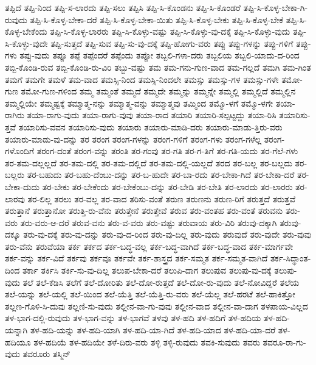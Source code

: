{ತಪ್ಪಿದೆ
ತಪ್ಪಿ-ನಿಂದ
ತಪ್ಪಿ-ಸ-ಲಾರದು
ತಪ್ಪಿ-ಸಲು
ತಪ್ಪಿಸಿ
ತಪ್ಪಿ-ಸಿ-ಕೊಂಡನು
ತಪ್ಪಿ-ಸಿ-ಕೊಂಡರೆ
ತಪ್ಪಿ-ಸಿ-ಕೊಳ್ಳ-ಬೇಕಾ-ಗಿ-ರುವುದು
ತಪ್ಪಿ-ಸಿ-ಕೊಳ್ಳ-ಬೇಕಾ-ದರೆ
ತಪ್ಪಿ-ಸಿ-ಕೊಳ್ಳ-ಬೇಕಾ-ಯಿತು
ತಪ್ಪಿ-ಸಿ-ಕೊಳ್ಳ-ಬೇಕು
ತಪ್ಪಿ-ಸಿ-ಕೊಳ್ಳ-ಬೇಕೆ
ತಪ್ಪಿ-ಸಿ-ಕೊಳ್ಳ-ಬೇಕೆಂದು
ತಪ್ಪಿ-ಸಿ-ಕೊಳ್ಳ-ಲಾರರು
ತಪ್ಪಿ-ಸಿ-ಕೊಳ್ಳು-ವಷ್ಟು
ತಪ್ಪಿ-ಸಿ-ಕೊಳ್ಳು-ವು-ದಕ್ಕೆ
ತಪ್ಪಿ-ಸಿ-ಕೊಳ್ಳು-ವುದು
ತಪ್ಪಿ-ಸಿ-ಕೊಳ್ಳು-ವುದೇ
ತಪ್ಪಿ-ಸುತ್ತದೆ
ತಪ್ಪಿ-ಸುವ
ತಪ್ಪಿ-ಸು-ವು-ದಕ್ಕೆ
ತಪ್ಪಿ-ಹೋಗು-ವರು
ತಪ್ಪು
ತಪ್ಪು-ಗಳನ್ನು
ತಪ್ಪು-ಗಳಿಗೆ
ತಪ್ಪು-ಗಳು
ತಪ್ಪು-ವುದು
ತಪ್ಪೂ
ತಪ್ಪೆ
ತಪ್ಪೆಂದರೆ
ತಪ್ಪೆಂದು
ತಪ್ಪೋ
ತಬ್ಬಲಿ-ಗಳಾ-ದರು
ತಬ್ಬಲಿಯ
ತಬ್ಬಲಿ-ಯಾದು-ದ-ರಿಂದ
ತಬ್ಬಿ-ಕೊಂಡಿ-ರುವ
ತಬ್ಬಿ-ಕೊಂಡಿ-ರು-ವಿರಿ
ತಬ್ಬು-ವಷ್ಟು
ತಮ
ತಮ-ಗನು-ಗುಣ-ವಾದ
ತಮ-ಗಲ್ಲದೆ
ತಮಗಿ
ತಮ-ಗಿಂತ
ತಮಗೆ
ತಮಗೇ
ತಮಳೆ
ತಮ-ವಾದ
ತಮಸ್ಸಿ-ನಿಂದ
ತಮಸ್ಸಿ-ನಿಂದಲೇ
ತಮಸ್ಸು
ತಮಸ್ಸು-ಗಳ
ತಮಸ್ಸು-ಗಳೇ
ತಮೋ-ಗುಣ
ತಮೋ-ಗುಣ-ಗಳಿಂದ
ತಮ್ಮ
ತಮ್ಮಂತೆ
ತಮ್ಮದೆ
ತಮ್ಮದೇ
ತಮ್ಮನ್ನು
ತಮ್ಮನ್ನೇ
ತಮ್ಮಲ್ಲಿ
ತಮ್ಮಲ್ಲಿದೆ
ತಮ್ಮಲ್ಲಿನ
ತಮ್ಮಲ್ಲಿಯೇ
ತಮ್ಮಷ್ಟಕ್ಕೆ
ತಮ್ಮಾತ್ಮ-ನನ್ನು
ತಮ್ಮಾತ್ಮ-ವನ್ನು
ತಮ್ಮಾತ್ಮವು
ತಮ್ಮಿಂದ
ತಮ್ಮೊ-ಳಗೆ
ತಮ್ಮೊ-ಳಗೇ
ತಯಾ-ರಾಗಿರು
ತಯಾ-ರಾಗು-ವುದು
ತಯಾ-ರಾಗು-ವುವು
ತಯಾ-ರಾದ
ತಯಾರಿ
ತಯಾರಿ-ಸಲ್ಪಟ್ಟದ್ದು
ತಯಾ-ರಿಸಿ
ತಯಾರಿಸು-ತ್ತವೆ
ತಯಾರಿಸು-ವವನ
ತಯಾರಿಸು-ವುದು
ತಯಾರು
ತಯಾರು-ಮಾಡಿ-ದರು
ತಯಾರು-ಮಾಡು-ತ್ತಿರು-ವರು
ತಯಾರು-ಮಾಡು-ವು-ದನ್ನು
ತರ
ತರಂಗ
ತರಂಗ-ಗಳನ್ನು
ತರಂಗ-ಗಳಿಗೆ
ತರಂಗ-ಗಳು
ತರಂಗ-ಗಳೆಲ್ಲ
ತರಂಗ-ಗಳೊಂದಿಗೆ
ತರಂಗ-ದಂತೆ
ತರಂಗ-ವನ್ನು
ತರಂತಿ
ತರ-ಗಂವು
ತರ-ಗತಿ
ತರ-ಗ-ತಿಗೆ
ತರ-ಗತಿ-ಯದು
ತರ-ಗೆಲೆ-ಗಳು
ತರ-ತಮ-ದಲ್ಲಲ್ಲದೆ
ತರ-ತಮ-ದಲ್ಲಿ
ತರ-ತಮ-ದಲ್ಲಿದೆ
ತರ-ತಮ-ದಲ್ಲಿ-ಯಲ್ಲದೆ
ತರದ
ತರ-ಬಲ್ಲ
ತರ-ಬಲ್ಲದು
ತರ-ಬಲ್ಲರು
ತರ-ಬಹುದು
ತರ-ಬಹು-ದೆಂಬು-ದನ್ನು
ತರ-ಬ-ಹುದೇ
ತರ-ಬಾ-ರದು
ತರ-ಬೇಕಾ-ಗಿದೆ
ತರ-ಬೇಕಾ-ದರೆ
ತರ-ಬೇಕಾ-ದುದು
ತರ-ಬೇಕು
ತರ-ಬೇಕೆಂದು
ತರ-ಬೇಕೆಂಬು-ದನ್ನು
ತರ-ಬೇಡಿ
ತರ-ಬೇತಿ
ತರ-ಲಾರದು
ತರ-ಲಾರರು
ತರ-ಲಾರವು
ತರ-ಲಿಲ್ಲ
ತರಲು
ತರ-ವಲ್ಲ
ತರ-ವಾದ
ತರಿಸು-ವಂತೆ
ತರುಣ
ತರುಣನು
ತರುಣ-ರಿಗೆ
ತರುತ್ತದೆ
ತರುತ್ತವೆ
ತರುತ್ತಾನೆ
ತರುತ್ತಾನೋ
ತರುತ್ತಿ-ರು-ವೆನು
ತರುತ್ತೇನೆ
ತರುತ್ತೇವೆ
ತರುವ
ತರು-ವಂತಹ
ತರು-ವಂತೆ
ತರುವನು
ತರು-ವರು
ತರು-ವರು-ಆ-ದರೆ
ತರುವ-ವನು
ತರು-ವ-ವರು
ತರು-ವಷ್ಟು
ತರುವಾಯ
ತರು-ವಿರಿ
ತರುವು-ದಕ್ಕಾಗಿ
ತರುವು-ದಕ್ಕೂ
ತರು-ವು-ದಕ್ಕೆ
ತರು-ವು-ದನ್ನು
ತರು-ವು-ದ-ರಿಂದ
ತರು-ವು-ದಿಲ್ಲ
ತರು-ವುದು
ತರುವುದೆ
ತರು-ವುದೇ
ತರು-ವುವು
ತರು-ವೆನು
ತರುವೆಯಾ
ತರ್ಕ
ತರ್ಕದ
ತರ್ಕ-ಬದ್ಧ-ವಲ್ಲ
ತರ್ಕ-ಬದ್ಧ-ವಾಗಿದೆ
ತರ್ಕ-ಬದ್ಧ-ವಾದ
ತರ್ಕ-ಮಾರ್ಗವೇ
ತರ್ಕ-ವನ್ನು
ತರ್ಕ-ವಿದೆ
ತರ್ಕವು
ತರ್ಕವೂ
ತರ್ಕವೇ
ತರ್ಕ-ಶಾಸ್ತ್ರದ
ತರ್ಕ-ಸಮ್ಮತ
ತರ್ಕ-ಸಮ್ಮತ-ವಾಗಿದೆ
ತರ್ಕ-ಸಿದ್ಧಾಂತ-ದಿಂದ
ತರ್ಕಾ
ತರ್ಕಿಸಿ
ತರ್ಕಿ-ಸು-ವು-ದಿಲ್ಲ
ತಲುಪ-ಬೇಕಾ-ದರೆ
ತಲುಪಿ-ದಾಗ
ತಲುಪುವ
ತಲುಪು-ವು-ದಕ್ಕೆ
ತಲುಪು-ವುದು
ತಲೆ
ತಲೆ-ಕೆಡಿಸಿ
ತಲೆಗೆ
ತಲೆ-ದೋರಿತು
ತಲೆ-ದೋ-ರುತ್ತದೆ
ತಲೆ-ದೋ-ರು-ವುದು
ತಲೆ-ನೋವಿದ್ದರೆ
ತಲೆಯ
ತಲೆ-ಯನ್ನು
ತಲೆ-ಯಲ್ಲಿ
ತಲೆ-ಯಿಂದ
ತಲೆ-ಯೆತ್ತಿ
ತಲೆ-ಯೆತ್ತಿ-ರು-ವರು
ತಲೆ-ಯೆಲ್ಲ
ತಲೆ-ಹರಟೆ
ತಲೆ-ಹಾಕಿತ್ತೋ
ತಲ್ಲಣ-ಗೊಳಿ-ಸಿ-ದುವು
ತಲ್ಲಣಿ-ಸು-ವುದು
ತಲ್ಲೀನ-ವಾ-ಗು-ವುವು
ತಲ್ಲೀನ-ವಾದ
ತಲ್ಲೀನ-ವಾ-ದಾಗ
ತಳಪಾಯ-ವಿಲ್ಲದ
ತಳ-ಭಾಗ-ದಲ್ಲಿ-ರುವುದು
ತಳ-ಭಾಗ-ವನ್ನು
ತಳ-ಭಾಗವೆ
ತಳವು
ತಳ-ಹದಿ
ತಳ-ಹದಿಗೆ
ತಳ-ಹದಿಯ
ತಳ-ಹದಿ-ಯನ್ನಾಗಿ
ತಳ-ಹದಿ-ಯನ್ನು
ತಳ-ಹದಿ-ಯಾಗಿ
ತಳ-ಹದಿ-ಯಾ-ಗಿದೆ
ತಳ-ಹದಿ-ಯಾದ
ತಳ-ಹದಿ-ಯಾ-ದರೆ
ತಳ-ಹದಿಯೂ
ತಳ-ಹದಿಯೆ
ತಳ-ಹದಿಯೇ
ತಳೆ-ದಿರು-ವರು
ತಳ್ಳಿ
ತಳ್ಳಿ-ರುವುದು
ತವಕಿ-ಸುವುದು
ತವರು
ತವರೂ-ರಾ-ಗು-ವುದು
ತವರೂರು
ತಸ್ಮಿನ್
}
